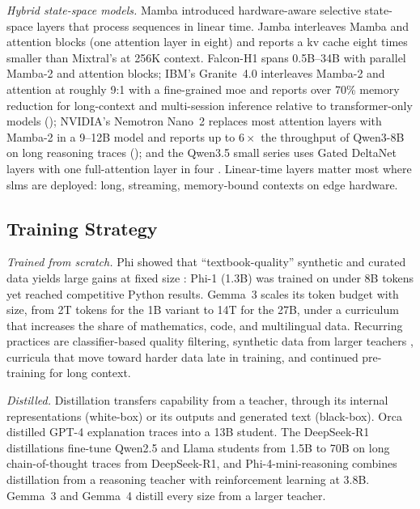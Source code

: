 \emph{Hybrid state-space models.} Mamba \citep{gu2023mamba} introduced hardware-aware selective state-space layers that process sequences in linear time. Jamba \citep{lieber2024jamba} interleaves Mamba and attention blocks (one attention layer in eight) and reports a \gls{kv} cache eight times smaller than Mixtral's at 256K context. Falcon-H1 \citep{falconh1_2025} spans 0.5B--34B with parallel Mamba-2 and attention blocks; IBM's Granite~4.0 \citep{granite4_2025} interleaves Mamba-2 and attention at roughly 9:1 with a fine-grained \gls{moe} and reports over 70\% memory reduction for long-context and multi-session inference relative to transformer-only models (\evC); NVIDIA's Nemotron Nano~2 \citep{nvidia2025nemotron_nano2} replaces most attention layers with Mamba-2 in a 9--12B model and reports up to $6\times$ the throughput of Qwen3-8B on long reasoning traces (\evC); and the Qwen3.5 small series uses Gated DeltaNet layers with one full-attention layer in four \citep{qwen3_5_2026}. Linear-time layers matter most where \glspl{slm} are deployed: long, streaming, memory-bound contexts on edge hardware.

\subsection{Training Strategy}
\label{supp:taxonomy_training}

\emph{Trained from scratch.} Phi showed that ``textbook-quality'' synthetic and curated data yields large gains at fixed size \citep{gunasekar2023phi1,li2023phi2}: Phi-1 (1.3B) was trained on under 8B tokens yet reached competitive Python results. Gemma~3 \citep{team2025gemma3} scales its token budget with size, from 2T tokens for the 1B variant to 14T for the 27B, under a curriculum that increases the share of mathematics, code, and multilingual data. Recurring practices are classifier-based quality filtering, synthetic data from larger teachers \citep{tinystories2023,mukherjee2023orca}, curricula that move toward harder data late in training, and continued pre-training for long context.

\emph{Distilled.} Distillation \citep{hinton2015distilling} transfers capability from a teacher, through its internal representations (white-box) or its outputs and generated text (black-box). Orca \citep{mukherjee2023orca} distilled GPT-4 explanation traces into a 13B student. The DeepSeek-R1 distillations \citep{deepseek2025r1} fine-tune Qwen2.5 and Llama students from 1.5B to 70B on long chain-of-thought traces from DeepSeek-R1, and Phi-4-mini-reasoning \citep{xu2025phi4mini_reasoning} combines distillation from a reasoning teacher with reinforcement learning at 3.8B. Gemma~3 and Gemma~4 \citep{team2025gemma3,gemma4_2026} distill every size from a larger teacher.

